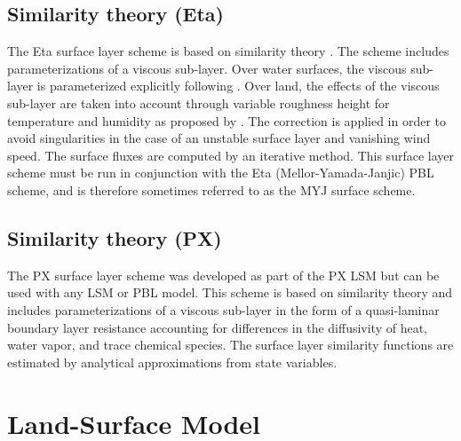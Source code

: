 \subsection{Similarity theory (Eta)}

The Eta surface layer scheme \citep{janjic96,janjic02} is based 
on similarity theory \citep{monin54}. The scheme 
includes parameterizations of a viscous sub-layer. Over water surfaces, the 
viscous sub-layer is parameterized explicitly following \citet{janjic94}. 
Over land, the effects of the viscous sub-layer are taken into account 
through variable roughness height for temperature and humidity as proposed by 
\citet{zilit95}. The \citet{beljaars94} correction is applied in order 
to avoid singularities in the case of an unstable surface layer and vanishing 
wind speed. The surface fluxes are computed by an iterative method. 
This surface layer scheme must be run in conjunction with the Eta
(Mellor-Yamada-Janjic) PBL scheme, and is therefore sometimes referred to
as the MYJ surface scheme.

\subsection{Similarity theory (PX)}

The PX surface layer scheme \citep{pleim06} was developed as part of the PX LSM but can be used with any LSM or PBL model.  This scheme is based on similarity theory and includes parameterizations of a viscous sub-layer in the form of a quasi-laminar boundary layer resistance accounting for differences in the diffusivity of heat, water vapor, and trace chemical species.   The surface layer similarity functions are estimated by analytical approximations from state variables.  

\section{Land-Surface Model}

